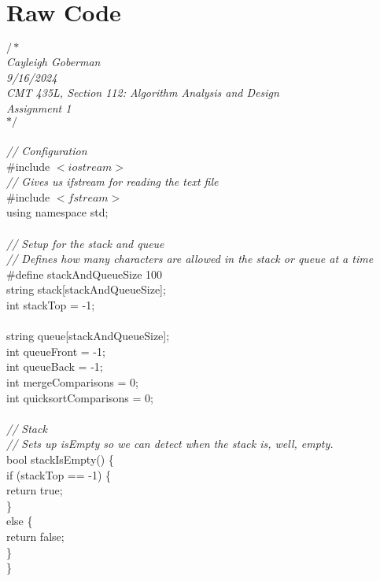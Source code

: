 \documentclass{article}
\begin{document}
\pagebreak
\section{Raw Code}

\begin {linenumbers}
\textit{
$/*$ \\
Cayleigh Goberman\\
9/16/2024\\
CMT 435L, Section 112: Algorithm Analysis and Design\\
Assignment 1\\
$*/$\\}
\\
\textit{// Configuration\\}
\#include $<iostream>$\\
\textit{// Gives us ifstream for reading the text file\\}
\#include $<fstream>$\\
using namespace std;\\
\\
\textit{// Setup for the stack and queue\\
// Defines how many characters are allowed in the stack or queue at a time\\}
\#define stackAndQueueSize 100\\
string stack[stackAndQueueSize];\\
int stackTop = -1;\\
\\
string queue[stackAndQueueSize];\\
int queueFront = -1;\\
int queueBack = -1;\\
int mergeComparisons = 0;\\
int quicksortComparisons = 0;\\
\\
\textit{// Stack\\
// Sets up isEmpty so we can detect when the stack is, well, empty.\\}
bool stackIsEmpty() \{\\
    \indent if (stackTop == -1) \{\\
       \indent \indent return true;\\
    \indent \}\\
    \indent else \{\\
        \indent \indent return false;\\
    \indent \}\\
\}\\

\end{linenumbers}
\end{document}
